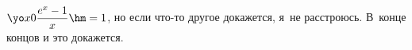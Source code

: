 \label{vzpex-1}
    $\yo x0 \dfrac{e^x-1}x\hm=1$, но если что-то другое докажется, я~не расстроюсь. В~конце концов и это докажется.
